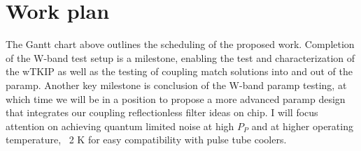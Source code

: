   
  \begin{gantt}{7}{12}
    \begin{ganttitle}
    \end{ganttitle}
    \begin{ganttitle}
    \end{ganttitle}
  \end{gantt}

\section*{Work plan}
The Gantt chart above outlines the scheduling of the proposed work. Completion of the
W-band test setup is a milestone, enabling the test and characterization of the wTKIP as well as the testing of coupling match solutions into and out of the paramp.
Another key milestone is conclusion of the W-band paramp testing, at which time we will
be in a position to propose a more advanced paramp design that integrates our coupling
reflectionless filter ideas on chip. I will focus attention on achieving quantum limited noise at high $P_P$ and at higher operating temperature, ~2 K for easy compatibility with pulse tube coolers. 











